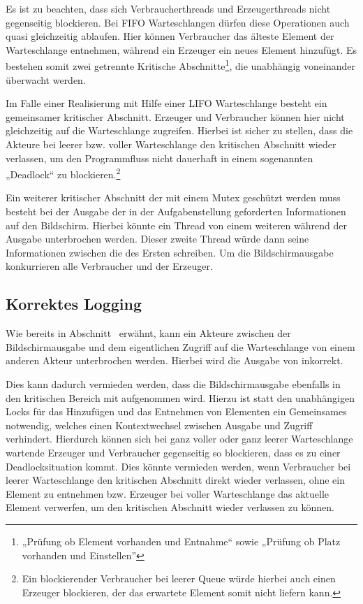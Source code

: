 Es ist zu beachten, dass sich Verbraucherthreads und Erzeugerthreads nicht gegenseitig blockieren. Bei \ac{FIFO} Warteschlangen dürfen diese Operationen auch quasi gleichzeitig ablaufen. Hier können Verbraucher das älteste Element der Warteschlange entnehmen, während ein Erzeuger ein neues Element hinzufügt. Es bestehen somit zwei getrennte Kritische Abschnitte\footnote{„Prüfung ob Element vorhanden und Entnahme“ sowie „Prüfung ob Platz vorhanden und Einstellen”}, die unabhängig voneinander überwacht werden.

Im Falle einer Realisierung mit Hilfe einer \ac{LIFO} Warteschlange besteht ein gemeinsamer kritischer Abschnitt. Erzeuger und Verbraucher können hier nicht gleichzeitig auf die Warteschlange zugreifen. Hierbei ist sicher zu stellen, dass die Akteure bei leerer bzw. voller Warteschlange den kritischen Abschnitt wieder verlassen, um den Programmfluss nicht dauerhaft in einem sogenannten „Deadlock“ zu blockieren.\footnote{Ein blockierender Verbraucher bei leerer Queue würde hierbei auch einen Erzeuger blockieren, der das erwartete Element somit nicht liefern kann.}

Ein weiterer kritischer Abschnitt der mit einem Mutex geschützt werden muss besteht bei der Ausgabe der in der Aufgabenstellung geforderten Informationen auf den Bildschirm. Hierbei könnte ein Thread von einem weiteren während der Ausgabe unterbrochen werden. Dieser zweite Thread würde dann seine Informationen zwischen die des Ersten schreiben. Um die Bildschirmausgabe konkurrieren alle Verbraucher und der Erzeuger.

\subsection{Korrektes Logging} %
\label{sub:korrektes_logging}
Wie bereits in Abschnitt~ erwähnt, kann ein Akteure  zwischen der Bildschirmausgabe und dem eigentlichen Zugriff auf die Warteschlange von einem anderen Akteur  unterbrochen werden. Hierbei wird die Ausgabe von  inkorrekt.

Dies kann dadurch vermieden werden, dass die Bildschirmausgabe ebenfalls in den kritischen Bereich mit aufgenommen wird. Hierzu ist statt den unabhängigen Locks für das Hinzufügen und das Entnehmen von Elementen ein Gemeinsames notwendig, welches einen Kontextwechsel zwischen Ausgabe und Zugriff verhindert. Hierdurch können sich bei ganz voller oder ganz leerer Warteschlange wartende Erzeuger und Verbraucher gegenseitig so blockieren, dass es zu einer Deadlocksituation kommt. Dies könnte vermieden werden, wenn Verbraucher bei leerer Warteschlange den kritischen Abschnitt direkt wieder verlassen, ohne ein Element zu entnehmen bzw. Erzeuger bei voller Warteschlange das aktuelle Element verwerfen, um den kritischen Abschnitt wieder verlassen zu können.

